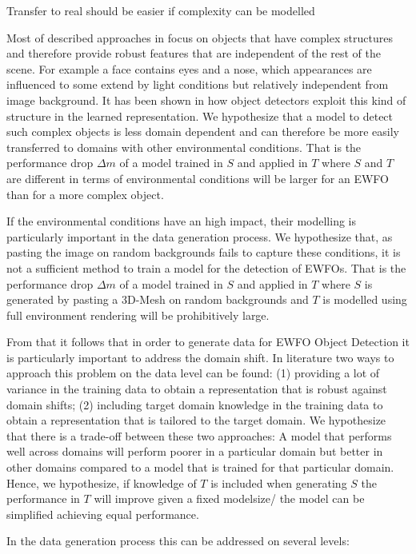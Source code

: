 Transfer to real should be easier if complexity can be modelled

Most of described approaches in  focus on objects that have complex structures and therefore provide robust features that are independent of the rest of the scene. For example a face contains eyes and a nose, which appearances are influenced to some extend by light conditions but relatively independent from image background. It has been shown in  how object detectors exploit this kind of structure in the learned representation. We hypothesize that a model to detect such complex objects is less domain dependent and can therefore be more easily transferred to domains with other environmental conditions. That is the performance drop $\Delta m$ of a model trained in $S$ and applied in $T$ where $S$ and $T$ are different in terms of environmental conditions will be larger for an \ac{EWFO} than for a more complex object.

If the environmental conditions have an high impact, their modelling is particularly important in the data generation process. We hypothesize that, as pasting the image on random backgrounds fails to capture these conditions, it is not a sufficient method to train a model for the detection of \acp{EWFO}. That is the performance drop $\Delta m$ of a model trained in $S$ and applied in $T$ where $S$ is generated by pasting a 3D-Mesh on random backgrounds and $T$ is modelled using full environment rendering will be prohibitively large.
 
From that it follows that in order to generate data for \ac{EWFO} Object Detection it is particularly important to address the domain shift. In literature two ways to approach this problem on the data level can be found: (1) providing a lot of variance in the training data to obtain a representation that is robust against domain shifts; (2) including target domain knowledge in the training data to obtain a representation that is tailored to the target domain. We hypothesize that there is a trade-off between these two approaches: A model that performs well across domains will perform poorer in a particular domain but better in other domains compared to a model that is trained for that particular domain. Hence, we hypothesize, if knowledge of $T$ is included when generating $S$ the performance in $T$ will improve given a fixed modelsize/ the model can be simplified achieving equal performance. 

In the data generation process this can be addressed on several levels:

